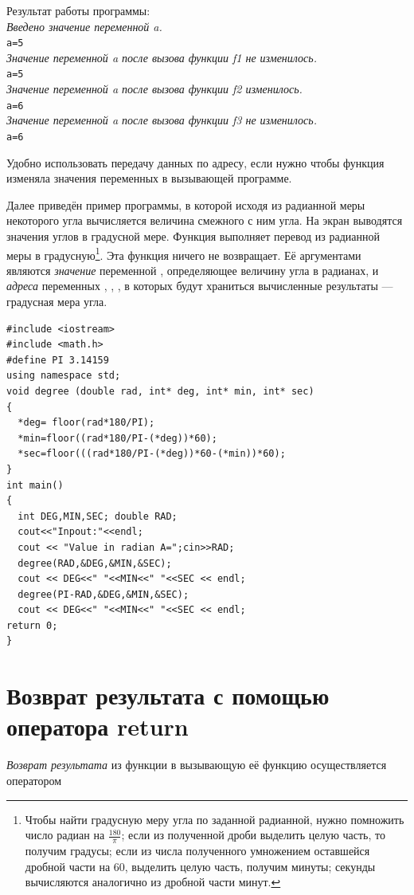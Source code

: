 Результат работы программы:\\
\emph{Введено значение переменной a.}\\
\verb!a=5! \\
\emph{Значение переменной a после вызова функции f1 не изменилось.}\\
\verb!a=5! \\
\emph{Значение переменной a после вызова функции f2 изменилось.}\\
\verb!a=6! \\
\emph{Значение переменной a после вызова функции f3 не изменилось.}\\
\verb!a=6! 

Удобно использовать передачу данных по адресу, если нужно чтобы функция изменяла значения переменных в вызывающей
программе.

Далее приведён пример программы, в которой исходя из радианной меры  некоторого угла вычисляется величина смежного с ним
угла. На экран выводятся значения углов в градусной мере. Функция  выполняет перевод из
радианной меры в градусную\footnote{Чтобы найти градусную меру угла по заданной радианной, нужно помножить число радиан
на  $\frac{180}{\pi }$; если из полученной дроби выделить целую часть, то получим градусы; если из числа полученного
умножением оставшейся дробной части на 60, выделить целую часть, получим минуты; секунды вычисляются аналогично из дробной
части минут.}. Эта функция ничего не возвращает. Её аргументами являются \emph{значение} переменной
, определяющее величину угла в радианах, и \emph{адреса} переменных
, , , в которых будут храниться вычисленные
результаты --- градусная мера угла. 
\begin{lstlisting}
#include <iostream>
#include <math.h>
#define PI 3.14159
using namespace std;
void degree (double rad, int* deg, int* min, int* sec)
{
  *deg= floor(rad*180/PI);
  *min=floor((rad*180/PI-(*deg))*60);
  *sec=floor(((rad*180/PI-(*deg))*60-(*min))*60);
}
int main()
{
  int DEG,MIN,SEC; double RAD;
  cout<<"Inpout:"<<endl;
  cout << "Value in radian A=";cin>>RAD;
  degree(RAD,&DEG,&MIN,&SEC);
  cout << DEG<<" "<<MIN<<" "<<SEC << endl;
  degree(PI-RAD,&DEG,&MIN,&SEC);
  cout << DEG<<" "<<MIN<<" "<<SEC << endl;
return 0;
}
\end{lstlisting}

\section[Возврат результата с помощью оператора return]{Возврат результата с помощью оператора return}
\emph{Возврат результата} из функции в вызывающую её функцию
осуществляется оператором

